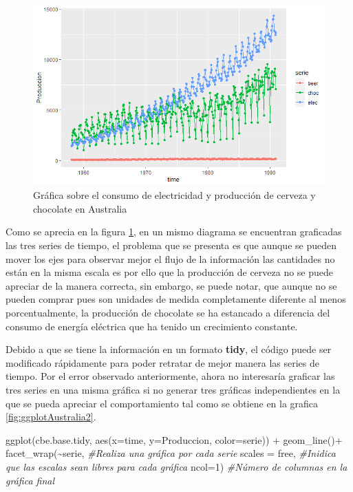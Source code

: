 \documentclass[
  spanish,
]{book}
\newenvironment{Shaded}{\begin{snugshade}}{\end{snugshade}}
\newcommand{\AttributeTok}[1]{\textcolor[rgb]{0.77,0.63,0.00}{#1}}
\newcommand{\CommentTok}[1]{\textcolor[rgb]{0.56,0.35,0.01}{\textit{#1}}}
\newcommand{\DecValTok}[1]{\textcolor[rgb]{0.00,0.00,0.81}{#1}}
\newcommand{\FunctionTok}[1]{\textcolor[rgb]{0.00,0.00,0.00}{#1}}
\newcommand{\NormalTok}[1]{#1}
\newcommand{\SpecialCharTok}[1]{\textcolor[rgb]{0.00,0.00,0.00}{#1}}
\newcommand{\StringTok}[1]{\textcolor[rgb]{0.31,0.60,0.02}{#1}}
\theoremstyle{remark}
\begin{document}
\begin{figure}

{\centering \includegraphics{Images/electric_ggplot} 

}

\caption{Gráfica sobre el consumo de electricidad y producción de cerveza y chocolate en Australia}\label{fig:ggplotAustralia}
\end{figure}

Como se aprecia en la figura \ref{fig:ggplotAustralia}, en un mismo diagrama se encuentran graficadas las tres series de tiempo, el problema que se presenta es que aunque se pueden mover los ejes para observar mejor el flujo de la información las cantidades no están en la misma escala es por ello que la producción de cerveza no se puede apreciar de la manera correcta, sin embargo, se puede notar, que aunque no se pueden comprar pues son unidades de medida completamente diferente al menos porcentualmente, la producción de chocolate se ha estancado a diferencia del consumo de energía eléctrica que ha tenido un crecimiento constante.

Debido a que se tiene la información en un formato \textbf{tidy}, el código puede ser modificado rápidamente para poder retratar de mejor manera las series de tiempo. Por el error observado anteriormente, ahora no interesaría graficar las tres series en una misma gráfica si no generar tres gráficas independientes en la que se pueda apreciar el comportamiento tal como se obtiene en la grafica \ref{fig:ggplotAustralia2}.

\begin{Shaded}
\begin{Highlighting}[]
\FunctionTok{ggplot}\NormalTok{(cbe.base.tidy, }\FunctionTok{aes}\NormalTok{(}\AttributeTok{x=}\NormalTok{time, }\AttributeTok{y=}\NormalTok{Produccion, }\AttributeTok{color=}\NormalTok{serie)) }\SpecialCharTok{+}
  \FunctionTok{geom\_line}\NormalTok{()}\SpecialCharTok{+}
  \FunctionTok{facet\_wrap}\NormalTok{(}\SpecialCharTok{\textasciitilde{}}\NormalTok{serie,   }\CommentTok{\#Realiza una gráfica por cada serie }
             \AttributeTok{scales  =} \StringTok{\textquotesingle{}free\textquotesingle{}}\NormalTok{,  }\CommentTok{\#Inidica que las escalas sean libres para cada gráfica}
             \AttributeTok{ncol=}\DecValTok{1}\NormalTok{) }\CommentTok{\#Número de columnas en la gráfica final }
\end{Highlighting}
\end{Shaded}
\end{document}
